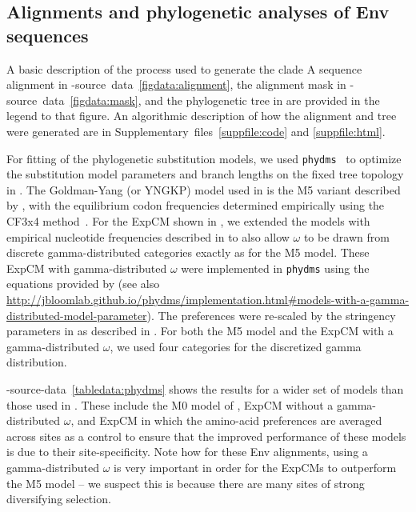 \documentclass[9pt]{elife}
\begin{document}
\subsection{Alignments and phylogenetic analyses of Env sequences}
A basic description of the process used to generate the clade A sequence alignment in -source~data~\ref{figdata:alignment}, the alignment mask in -source~data~\ref{figdata:mask}, and the phylogenetic tree in  are provided in the legend to that figure.
An algorithmic description of how the alignment and tree were generated are in Supplementary~files~\ref{suppfile:code} and \ref{suppfile:html}.

For fitting of the phylogenetic substitution models, we used \texttt{phydms}~\citep[][\url{http://jbloomlab.github.io/phydms/}, version 2.2.1]{hilton2017phydms} to optimize the substitution model parameters and branch lengths on the fixed tree topology in .
The Goldman-Yang (or YNGKP) model used in  is the M5 variant described by \citet{yang2000codon}, with the equilibrium codon frequencies determined empirically using the CF3x4 method~\citep{pond2010correcting}.
For the ExpCM shown in , we extended the models with empirical nucleotide frequencies described in \citet{hilton2017phydms} to also allow $\omega$ to be drawn from discrete gamma-distributed categories exactly as for the M5 model.
These ExpCM with gamma-distributed $\omega$ were implemented in \texttt{phydms} using the equations provided by \citet{yang1994maximum} (see also \url{http://jbloomlab.github.io/phydms/implementation.html#models-with-a-gamma-distributed-model-parameter}).
The preferences were re-scaled by the stringency parameters in  as described in \citet{hilton2017phydms}.
For both the M5 model and the ExpCM with a gamma-distributed $\omega$, we used four categories for the discretized gamma distribution.

-source-data~\ref{tabledata:phydms} shows the results for a wider set of models than those used in . 
These include the M0 model of \citet{yang2000codon}, ExpCM without a gamma-distributed $\omega$, and ExpCM in which the amino-acid preferences are averaged across sites as a control to ensure that the improved performance of these models is due to their site-specificity.
Note how for these Env alignments, using a gamma-distributed $\omega$ is very important in order for the ExpCMs to outperform the M5 model -- we suspect this is because there are many sites of strong diversifying selection.
\end{document}
